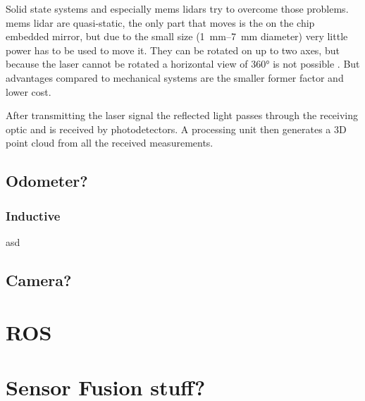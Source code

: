 Solid state systems and especially \acrshort{mems} \acrshort{lidar}s try to overcome those problems.
\acrshort{mems} \acrshort{lidar} are quasi-static, the only part that moves is the on the chip embedded mirror, but due to the small size (\SIrange{1}{7}{\milli\metre} diameter) very little power has to be used to move it.
They can be rotated on up to two axes, but because the laser cannot be rotated a horizontal view of 360° is not possible .
But advantages compared to mechanical systems are the smaller former factor and lower cost.

After transmitting the laser signal the reflected light passes through the receiving optic and is received by photodetectors.
A processing unit then generates a 3D point cloud from all the received measurements.
\cite{Wang2020}
\cite{Vaughan2006}


\subsection{Odometer?}
\subsubsection{Inductive}
asd


\subsection{Camera?}



\section{ROS}



\section{Sensor Fusion stuff?}



